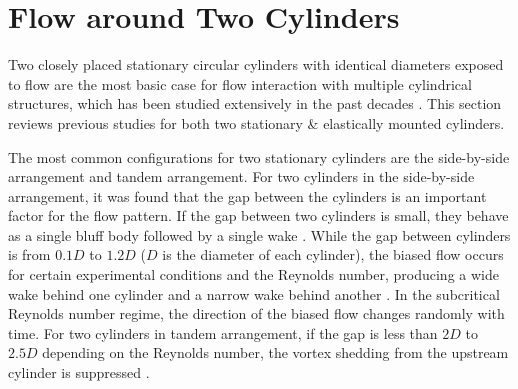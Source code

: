 %



\section{Flow around Two Cylinders}  \label{sec:fa2} %
%
Two closely placed stationary circular cylinders with identical diameters exposed to flow are the most basic case for flow interaction with multiple cylindrical structures, which has been studied extensively in the past decades \cite{Zdravkovich1977b,Zdravkovich1987a,Sumner2010}. This section reviews previous studies for both two stationary \& elastically mounted cylinders.

The most common configurations for two stationary cylinders are the side-by-side arrangement and tandem arrangement. For two cylinders in the side-by-side arrangement, it was found that the gap between the cylinders is an important factor for the flow pattern. If the gap between two cylinders is small, they behave as a single bluff body followed by a single wake \cite{Williamson1985a,Kim1988}. While the gap between cylinders is from $ 0.1D $ to $ 1.2D $ ($ D $ is the diameter of each cylinder), the biased flow occurs for certain experimental conditions and the Reynolds number, producing a wide wake behind one cylinder and a narrow wake behind another \cite{Zdravkovich1977b,Williamson1985a,alam2003aerodynamic}. In the subcritical Reynolds number regime, the direction of the biased flow changes randomly with time. For two cylinders in tandem arrangement, if the gap is less than $ 2D $ to $ 2.5D $ depending on the Reynolds number, the vortex shedding from the upstream cylinder is suppressed \cite{tasaka2006hysteretic,Mizushima2005,Meneghini2001}. 

